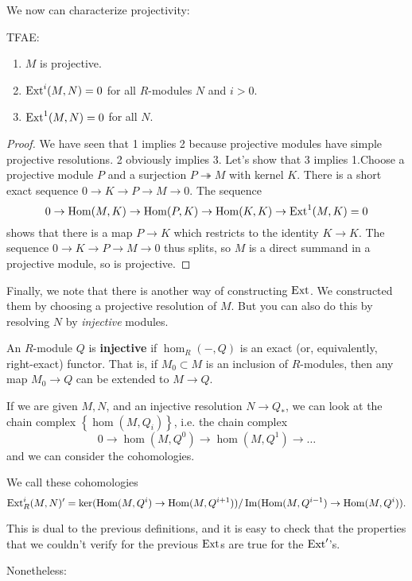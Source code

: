 We now can characterize projectivity:
\begin{corollary}
TFAE:
\begin{enumerate}
\item $M$ is projective.
\item $\operatorname{Ext}^i(M,N) = 0$ for all $R$-modules $N$ and $i>0$.
\item  $\operatorname{Ext}^1(M,N)=0$ for all $N$.
\end{enumerate}
\end{corollary}
\begin{proof}
We have seen that 1 implies 2 because projective modules have
simple projective
resolutions. 2 obviously implies 3. Let's show that 3 implies
1.Choose a
projective module $P$ and a surjection $P \twoheadrightarrow M$
with kernel
$K$. There is a short exact sequence $0 \to K \to P \to M \to
0$. The sequence
\[ 0 \to \operatorname{Hom}(M,K) \to \operatorname{Hom}(P,K) \to \operatorname{Hom}(K,K) \to
\operatorname{Ext}^1(M,K)=0\]
shows that there is a map $P \to K$ which restricts to the
identity $K \to K$.
The sequence $0 \to K \to P \to M \to 0$ thus splits, so $M$ is
a direct
summand in a projective module, so is projective.
\end{proof}


Finally, we note that there is another way of constructing
$\operatorname{Ext}$. We
constructed them by choosing a projective resolution of $M$. But
you can also
do this by resolving $N$ by \emph{injective} modules.
\begin{definition}
An $R$-module $Q$ is \textbf{injective} if $\hom_R(-,Q)$ is an
exact (or,
equivalently, right-exact) functor. That is, if $M_0 \subset M$
is an inclusion
of $R$-modules, then any map $M_0 \to Q$ can be extended to $M
\to Q$.
\end{definition}

If we are given $M,N$, and an injective resolution $N \to Q_*$,
we can look at
the chain complex $\left\{\hom(M,Q_i)\right\}$, i.e. the chain
complex
\[ 0 \to \hom(M, Q^0) \to \hom(M, Q^1) \to \dots  \]
and we can consider the cohomologies.

\begin{definition}
We call these cohomologies
\[ \operatorname{Ext}^i_R(M,N)' = \ker(\operatorname{Hom}(M, Q^i) \to \operatorname{Hom}(M,
Q^{i+1}))/\operatorname{Im}(\operatorname{Hom}(M,
Q^{i-1}) \to \operatorname{Hom}(M, Q^i)).  \]
\end{definition}

This is dual to the previous definitions, and it is easy to
check that the
properties that we couldn't verify for the previous $\operatorname{Ext}$s are
true for the
$\operatorname{Ext}'$'s.

Nonetheless:


